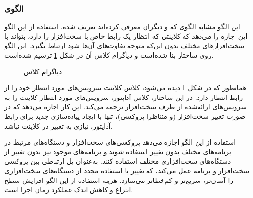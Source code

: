 \subsubsection{الگوی }
\label{HWAdapterSec}
\begin{RTL}
این الگو \cite{ref1} مشابه الگوی  که  و دیگران
\cite{ref3} معرفی کرده‌اند تعریف شده. استفاده از این الگو این اجازه را
می‌دهد که کلاینتی که انتظار یک رابط خاص با سخت‌افزار را دارد، بتواند با
سخت‌افزارهای مختلف بدون این‌که متوجه تفاوت‌های آن‌ها شود ارتباط بگیرد.
این الگو روی ساختار  بنا شده‌است و
دیاگرام کلاس آن در شکل \ref{HWAdapterClassDiag} ترسیم شده‌است.
\end{RTL}
\begin{figure}[h!]
\centering
{}
\caption{دیاگرام کلاس }
\label{HWAdapterClassDiag}
\end{figure}
\begin{RTL}
همانطور که در شکل \ref{HWAdapterClassDiag} دیده می‌شود،
کلاس کلاینت سرویس‌های مورد انتظار خود را از رابط
 انتظار دارد.
در این ساختار، کلاس آداپتور، سرویس‌های مورد انتظار کلاینت را به سرویس‌های ارائه‌شده
از طرف سخت‌افزار ترجمه می‌کند. این کار اجازه می‌دهد که در صورت تغییر سخت‌افزار
(و متناظرا پروکسی)، تنها با ایجاد پیاده‌سازی جدید برای رابط آداپتور، نیازی به تغییر
در کلاینت نباشد.
\end{RTL}
\begin{RTL}
استفاده از این الگو اجازه می‌دهد پروکسی‌های سخت‌افزار و دستگاه‌های مرتبط در
برنامه‌های مختلف بدون تغییر استفاده شوند و برنامه‌های موجود نیز بدون
تغییر از دستگاه‌های سخت‌افزاری مختلف استفاده کنند.
 به‌عنوان پل ارتباطی بین پروکسی سخت‌افزار
و برنامه عمل می‌کند، که تغییر یا استفاده مجدد از دستگاه‌های سخت‌افزاری را آسان‌تر،
سریع‌تر و کم‌خطاتر می‌سازد. هزینه استفاده از این الگو افزایش سطح انتزاع
و کاهش اندک عملکرد زمان اجرا است.
\end{RTL}